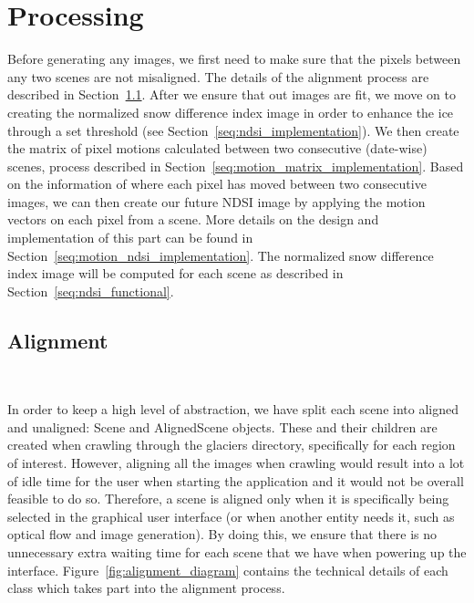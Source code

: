 \documentclass[12pt, a4paper]{report}
\begin{document}

	\section{Processing}
	\label{seq:processing}

	\par Before generating any images, we first need to make sure that the pixels between any two scenes are not misaligned. The details of the alignment process are described in Section~\ref{seq:alignment_implementation}. After we ensure that out images are fit, we move on to creating the normalized snow difference index image in order to enhance the ice through a set threshold (see Section~\ref{seq:ndsi_implementation}). We then create the matrix of pixel motions calculated between two consecutive (date-wise) scenes, process described in Section~\ref{seq:motion_matrix_implementation}. Based on the information of where each pixel has moved between two consecutive images, we can then create our future NDSI image by applying the motion vectors on each pixel from a scene. More details on the design and implementation of this part can be found in Section~\ref{seq:motion_ndsi_implementation}.
	The normalized snow difference index image will be computed for each scene as described in Section~\ref{seq:ndsi_functional}.
	
	
	\subsection{Alignment}
	\label{seq:alignment_implementation}\
	
	\par In order to keep a high level of abstraction, we have split each scene into aligned and unaligned: Scene and AlignedScene objects. These and their children are created when crawling through the glaciers directory, specifically for each region of interest. However, aligning all the images when crawling would result into a lot of idle time for the user when starting the application and it would not be overall feasible to do so. Therefore, a scene is aligned only when it is specifically being selected in the graphical user interface (or when another entity needs it, such as optical flow and image generation). By doing this, we ensure that there is no unnecessary extra waiting time for each scene that we have when powering up the interface. Figure~\ref{fig:alignment_diagram} contains the technical details of each class which takes part into the alignment process.
	
\end{document}
